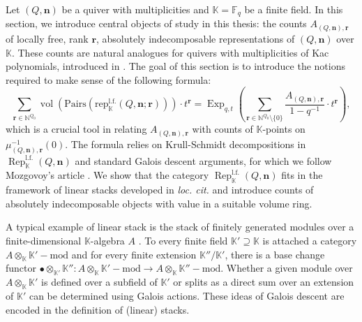 \documentclass[11pt,english]{article}
\numberwithin{equation}{section}
\numberwithin{figure}{section}
\theoremstyle{definition}
\theoremstyle{plain}
\theoremstyle{remark}
\DeclareMathOperator{\Rep}{Rep}
\DeclareMathOperator{\vol}{vol}
\DeclareMathOperator{\Exp}{Exp}
\newcommand\nn{\mathbf{n}}
\newcommand\rr{\mathbf{r}}
\newcommand\NN{\mathbb{N}}
\newcommand\FF{\mathbb{F}}
\newcommand\KK{\mathbb{K}}
\begin{document}
Let $(Q,\nn)$ be a quiver with multiplicities and $\KK=\FF_{q}$
be a finite field. In this section, we introduce central objects of
study in this thesis: the counts $A_{(Q,\nn),\rr}$ of locally free,
rank $\rr$, absolutely indecomposable representations of $(Q,\nn)$
over $\KK$. These counts are natural analogues for quivers with multiplicities
of Kac polynomials, introduced in \cite{Kac82}. The goal of this
section is to introduce the notions required to make sense of the
following formula:\[
\sum_{\rr\in\NN^{Q_0}}
\vol (\mathrm{Pairs}(\mathrm{rep}_{\KK}^{\mathrm{l.f.}}(Q,\nn;\rr)))\cdot t^{\rr}
=
\Exp_{q,t}\left(\sum_{\rr\in\NN^{Q_0}\setminus\{0\}}\frac{A_{(Q,\nn),\rr}}{1-q^{-1}}\cdot t^{\rr}\right),
\]which is a crucial tool in relating $A_{(Q,\nn),\rr}$ with counts
of $\KK$-points on $\mu_{(Q,\nn),\rr}^{-1}(0)$. The formula relies
on Krull-Schmidt decompositions in $\Rep_{\KK}^{\mathrm{l.f.}}(Q,\nn)$
and standard Galois descent arguments, for which we follow Mozgovoy's
article \cite{Moz19}. We show that the category $\Rep_{\KK}^{\mathrm{l.f.}}(Q,\nn)$
fits in the framework of linear stacks developed in \textit{loc. cit.}
and introduce counts of absolutely indecomposable objects with value
in a suitable volume ring.

A typical example of linear stack is the stack of finitely generated
modules over a finite-dimensional $\KK$-algebra $A$ . To every finite
field $\KK'\supseteq\KK$ is attached a category $A\otimes_{\KK}\KK'-\mathrm{mod}$
and for every finite extension $\KK''/\KK'$, there is a base change
functor $\bullet\otimes_{\KK'}\KK'':A\otimes_{\KK}\KK'-\mathrm{mod}\rightarrow A\otimes_{\KK}\KK''-\mathrm{mod}$.
Whether a given module over $A\otimes_{\KK}\KK'$ is defined over
a subfield of $\KK'$ or splits as a direct sum over an extension
of $\KK'$ can be determined using Galois actions. These ideas of
Galois descent are encoded in the definition of (linear) stacks.
\end{document}
